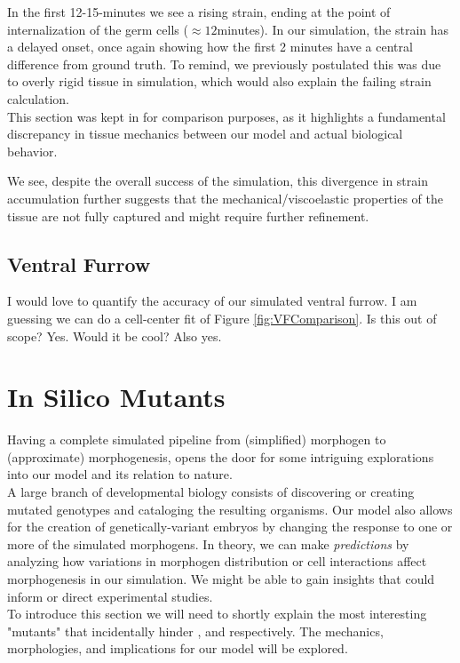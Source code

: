 In the first 12-15-minutes we see a rising strain, ending at the point of internalization of the germ cells ($\approx12$minutes). In our simulation, the strain has a delayed onset, once again showing how the first 2 minutes have a central difference from ground truth. To remind, we previously postulated this was due to overly rigid tissue in simulation, which would also explain the failing strain calculation. \\

This section was kept in for comparison purposes, as it highlights a fundamental discrepancy in tissue mechanics between our model and actual biological behavior.  

We see, despite the overall success of the simulation, this divergence in strain accumulation further suggests that the mechanical/viscoelastic properties of the tissue are not fully captured and might require further refinement. 


\subsection{Ventral Furrow}
I would love to quantify the accuracy of our simulated ventral furrow.
I am guessing we can do a cell-center fit of Figure \ref{fig:VFComparison}.
Is this out of scope? Yes. Would it be cool? Also yes.
\newpage
\section{In Silico Mutants}
Having a complete simulated pipeline from (simplified) morphogen to (approximate) morphogenesis, opens the door for some intriguing explorations into our model and its relation to nature. \\

A large branch of developmental biology consists of discovering or creating mutated genotypes and cataloging the resulting organisms. 
Our model also allows for the creation of genetically-variant embryos by changing the response to one or more of the simulated morphogens. In theory, we can make \textit{predictions} by analyzing how variations in morphogen distribution or cell interactions affect morphogenesis in our simulation. We might be able to gain insights that could inform or direct experimental studies.\\

To introduce this section we will need to shortly explain the most interesting "mutants" that incidentally hinder ,  and  respectively. The mechanics, morphologies, and implications for our model will be explored. 

